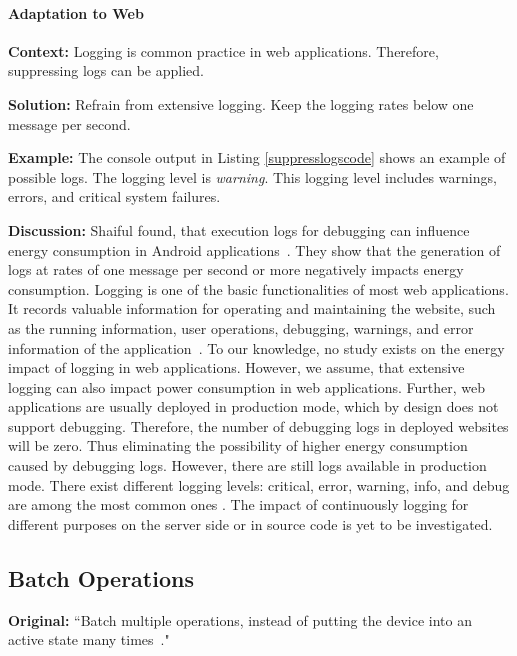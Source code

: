\paragraph{Adaptation to Web}\mbox{}

\textbf{Context:} Logging is common practice in web applications. Therefore, suppressing logs can be applied.

\textbf{Solution:} Refrain from extensive logging. Keep the logging rates below one message per second.

\textbf{Example:} The console output in Listing \ref{suppresslogscode} shows an example of possible logs. The logging level is \textit{warning}. This logging level includes warnings, errors, and critical system failures.



\textbf{Discussion:} Shaiful \etal found, that execution logs for debugging can influence energy consumption in Android applications~\cite{Shaiful2018}. They show that the generation of logs at rates of one message per second or more negatively impacts energy consumption. Logging is one of the basic functionalities of most web applications. It records valuable information for operating and maintaining the website, such as the running information, user operations, debugging, warnings, and error information of the application~\cite{Pan2022}. To our knowledge, no study exists on the energy impact of logging in web applications. However, we assume, that extensive logging can also impact power consumption in web applications. Further, web applications are usually deployed in production mode, which by design does not support debugging. Therefore, the number of debugging logs in deployed websites will be zero. Thus eliminating the possibility of higher energy consumption caused by debugging logs. However, there are still logs available in production mode. There exist different logging levels: critical, error, warning, info, and debug are among the most common ones \cite{python-docs-logging}. The impact of continuously logging for different purposes on the server side or in source code is yet to be investigated.

\subsection{Batch Operations} \label{sec:patterns-BatchOperations}
\textbf{Original:} ``Batch multiple operations, instead of putting the device into an active state many times~\cite{cruz2019catalog}."

